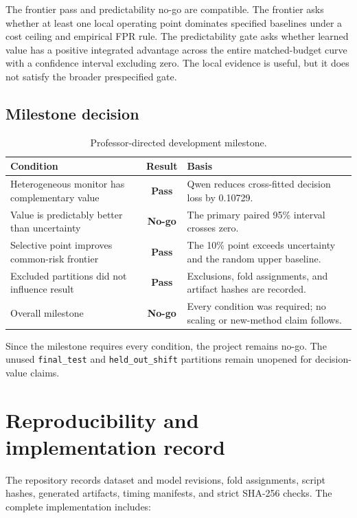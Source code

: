 \documentclass[11pt,a4paper]{article}
\newcommand{\code}[1]{\texttt{#1}}
\newcommand{\pass}{\textbf{Pass}}
\newcommand{\nogo}{\textbf{No-go}}
\begin{document}
The frontier pass and predictability no-go are compatible. The frontier asks whether at least one local operating point dominates specified baselines under a cost ceiling and empirical FPR rule. The predictability gate asks whether learned value has a positive integrated advantage across the entire matched-budget curve with a confidence interval excluding zero. The local evidence is useful, but it does not satisfy the broader prespecified gate.

\subsection{Milestone decision}

\begin{table}[htbp]
\centering
\caption{Professor-directed development milestone.}
\label{tab:milestone}
\begin{tabularx}{\textwidth}{@{}>{\raggedright\arraybackslash}p{}cY@{}}
\toprule
Condition & Result & Basis \\
\midrule
Heterogeneous monitor has complementary value & \pass & Qwen reduces cross-fitted decision loss by 0.10729. \\
Value is predictably better than uncertainty & \nogo & The primary paired 95\% interval crosses zero. \\
Selective point improves common-risk frontier & \pass & The 10\% point exceeds uncertainty and the random upper baseline. \\
Excluded partitions did not influence result & \pass & Exclusions, fold assignments, and artifact hashes are recorded. \\
\midrule
Overall milestone & \nogo & Every condition was required; no scaling or new-method claim follows. \\
\bottomrule
\end{tabularx}
\end{table}

Since the milestone requires every condition, the project remains no-go. The unused \code{final\_test} and \code{held\_out\_shift} partitions remain unopened for decision-value claims.

\section{Reproducibility and implementation record}

The repository records dataset and model revisions, fold assignments, script hashes, generated artifacts, timing manifests, and strict SHA-256 checks. The complete implementation includes:
\end{document}
